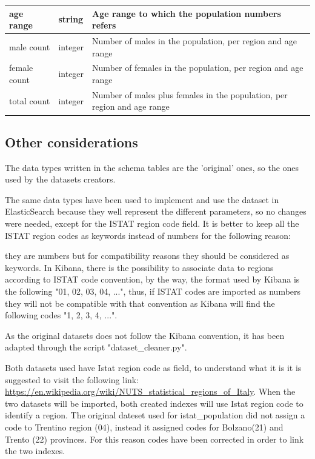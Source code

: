 \documentclass{article}
\begin{document}
\newpage
\begin{center}
\begin{tabular}{ |m{4cm}|m{2cm}|m{4.5cm}|}
\hline
  age range & string & Age range to which the population numbers refers\\
    \hline
  male count & integer & Number of males in the population, per region and age range\\
    \hline

  female count & integer & Number of females in the population, per region and age range\\
    \hline
  total count & integer & Number of males plus females in the population, per region and age range\\
    \hline
  \end{tabular}
\end{center}
\hfill\break

\subsection{Other considerations}
The data types written in the schema tables are the 'original' ones, so the ones used by the datasets creators.

The same data types have been used to implement and use the dataset in ElasticSearch because they well represent the different parameters, so no changes were needed, except for the ISTAT region code field.
It is better to keep all the ISTAT region codes as keywords instead of numbers for the following reason:

they are numbers but for compatibility reasons they should be considered as keywords. In Kibana, there is the possibility to associate data to regions according to ISTAT code convention, by the way, the format used by Kibana is the following "01, 02, 03, 04, ...", thus, if ISTAT codes are imported as numbers they will not be compatible with that convention as Kibana will find the following codes "1, 2, 3, 4, ...".

As the original datasets does not follow the Kibana convention, it has been adapted through the script {\selectfont"dataset\_cleaner.py"}.

\hfill\break
Both datasets used have Istat region code as field, to understand what it is it is suggested to visit the following link: \\ \url{https://en.wikipedia.org/wiki/NUTS\_statistical\_regions\_of\_Italy}.
\hfill\break
\hfill\break
When the two datasets will be imported, both created indexes will use Istat region code to identify a region. The original dateset used for istat\_population did not assign a code to Trentino region (04), instead it assigned codes for Bolzano(21) and Trento (22) provinces. For this reason codes have been corrected in order to link the two indexes.
\end{document}

